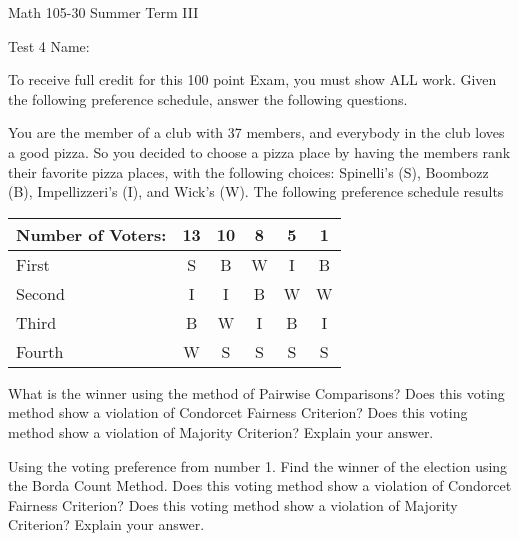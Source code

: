 \documentclass[11pt,epsfig]{article}
\begin{document}
Math 105-30 Summer Term III 

Test 4 \hspace{1.9in} {Name:} {\underline {\hspace{3.5in}}}
\vspace{2pc}

To receive full credit for this 100 point Exam, you must show ALL work. Given the following preference schedule, answer the following questions.
\vspace{0.5pc}

   
\begin{problem}{15}
You are the member of a club with 37 members, and everybody in the club loves a good pizza. So you decided to choose a pizza place by having the members rank their favorite pizza places, with the following choices: Spinelli’s (S), Boombozz (B), Impellizzeri’s (I), and Wick’s (W). The following preference schedule results


 \begin{center}
 \begin{tabular}{ | l | c | c  |  c |  c | c |}
   \hline
   Number of Voters: & 13 & 10 & 8 & 5 & 1\\ \hline
   First & S & B & W & I & B \\ \hline
   Second & I & I & B & W & W \\ \hline
   Third & B & W & I & B & I \\ \hline
   Fourth & W & S & S & S & S \\ \hline
   \end{tabular}
  \end{center}
What is the winner using the method of Pairwise Comparisons? Does this voting method show a violation of Condorcet Fairness Criterion? Does this voting method show a violation of Majority Criterion? Explain your answer. 


\vfill
\end{problem}


\begin{problem}{15}
Using the voting preference from number 1. Find the winner of the election using the Borda Count Method. Does this voting method show a violation of Condorcet Fairness Criterion? Does this voting method show a violation of Majority Criterion? Explain your answer.
\vfill
\end{problem}
\end{document}
